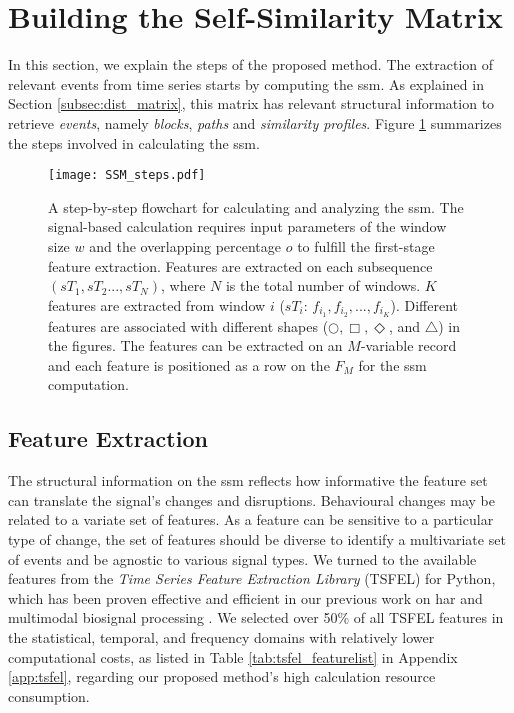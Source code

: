 \section{Building the Self-Similarity Matrix}

In this section, we explain the steps of the proposed method. The extraction of relevant events from time series starts by computing the \gls{ssm}. As explained in Section \ref{subsec:dist_matrix}, this matrix has relevant structural information to retrieve \textit{events}, namely \textit{blocks}, \textit{paths} and \textit{similarity profiles}. Figure \ref{fig:SSM_scheme} summarizes the steps involved in calculating the \gls{ssm}.

\begin{figure}
\centering
    \texttt{[image: SSM\_steps.pdf]}
    \caption{A step-by-step flowchart for calculating and analyzing the \gls{ssm}. The signal-based calculation requires input parameters of the window size $w$ and the overlapping percentage $o$ to fulfill the first-stage feature extraction. Features are extracted on each subsequence $(sT_1, sT_2..., sT_N)$, where $N$ is the total number of windows. $K$ features are extracted from window $i$ ($sT_i$: $f_{i_1}, f_{i_2}, ..., f_{i_K}$). Different features are associated with different shapes ($\bigcirc, \Box, \Diamond$, and $\triangle$) in the figures. The features can be extracted on an $M$-variable record and each feature is positioned as a row on the $F_M$ for the \gls{ssm} computation.}
    \label{fig:SSM_scheme}
\end{figure}

\subsection{Feature Extraction}

The structural information on the \gls{ssm} reflects how informative the feature set can translate the signal's changes and disruptions. Behavioural changes may be related to a variate set of features. As a feature can be sensitive to a particular type of change, the set of features should be diverse to identify a multivariate set of events and be agnostic to various signal types. We turned to the available features from the \textit{Time Series Feature Extraction Library} (TSFEL) \cite{tsfel} for Python, which has been proven effective and efficient in our previous work on \gls{har} and multimodal biosignal processing \cite{liu22pipeline, liu2021thesis}. We selected over 50\% of all TSFEL features in the statistical, temporal, and frequency domains with relatively lower computational costs, as listed in Table \ref{tab:tsfel_featurelist} in Appendix \ref{app:tsfel}, regarding our proposed method's high calculation resource consumption.

